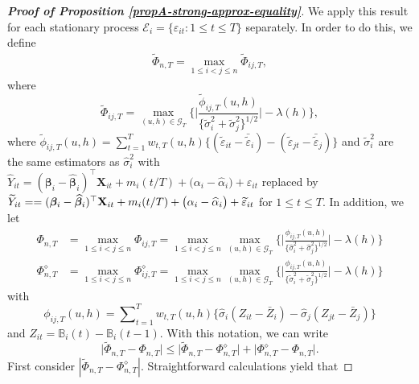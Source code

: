 \documentclass[a4paper,12pt]{article}
\begin{document}
\begin{proof}[\textnormal{\textbf{Proof of Proposition \ref{propA-strong-approx-equality}}}]
We apply this result for each stationary process $\mathcal{E}_i = \{\varepsilon_{it}: 1 \leq t \leq T\}$ separately. In order to do this, we define 
\begin{align}\label{Phi-tilde-statistic}
\widetilde{\Phi}_{n,T} = \max_{1 \le i < j \le n} \widetilde{\Phi}_{ij,T},
\end{align}
where
\[ \widetilde{\Phi}_{ij, T} = \max_{(u,h) \in \mathcal{G}_T} \Big\{ \Big|\frac{\widetilde{\phi}_{ij, T}(u,h)}{\{\widetilde{\sigma}_i^2 + \widetilde{\sigma}_j^2 \}^{1/2}} \Big| - \lambda(h) \Big\}, \]
where $\widetilde{\phi}_{ij, T}(u,h) = \sum\nolimits_{t=1}^T w_{t,T}(u,h) \big\{ (\widetilde{\varepsilon}_{it} - \bar{\widetilde{\varepsilon}}_i)  - (\widetilde{\varepsilon}_{jt} - \bar{\widetilde{\varepsilon}}_j)\big\}$ and $\widetilde{\sigma}^2_i$ are the same estimators as $\widehat{\sigma}^2_i$ with $\widehat{Y}_{it} = (\bm{\beta}_i - \widehat{\bm{\beta}}_i)^\top \mathbf{X}_{it} + m_i ( t/T) + \big( \alpha_i - \widehat{\alpha}_i \big) + \varepsilon_{it}$
replaced by $\widetilde{Y}_{it} = \linebreak = (\bm{\beta}_i - \widehat{\bm{\beta}}_i)^\top \mathbf{X}_{it} + m_i(t/T) + \big( \alpha_i - \widehat{\alpha}_i \big) + \widetilde{\varepsilon}_{it}$  for $1 \le t \le T$. In addition, we let
\begin{align*}
\Phi_{n, T} & = \max_{1\leq i < j \leq n} \Phi_{ij, T}= \max_{1\leq i < j \leq n} \max_{(u,h) \in \mathcal{G}_T} \Big\{ \Big|\frac{\phi_{ij, T}(u,h)}{\{\widehat{\sigma}_i^2 + \widehat{\sigma}_j^2 \}^{1/2}}\Big| - \lambda(h) \Big\} \\
\Phi_{n, T}^{\diamond} & =\max_{1\leq i < j \leq n} \Phi_{ij, T}^{\diamond} = \max_{1\leq i< j \leq n}\max_{(u,h) \in \mathcal{G}_T} \Big\{ \Big|\frac{\phi_{ij, T}(u,h)}{\{\widetilde{\sigma}_i^2 + \widetilde{\sigma}_j^2 \}^{1/2}}\Big| - \lambda(h) \Big\} 
\end{align*}
with $$\phi_{ij, T}(u,h) = \sum\nolimits_{t=1}^T w_{t,T}(u,h) \big\{ \widehat{\sigma}_i (Z_{it} - \bar{Z}_i) - \widehat{\sigma}_j (Z_{jt} - \bar{Z}_j) \big\}$$ and $Z_{it} = \mathbb{B}_i(t) - \mathbb{B}_i(t-1)$. With this notation, we can write 
\begin{equation}\label{eq-strongapprox-bound1}
\big| \widetilde{\Phi}_{n, T} - \Phi_{n, T} \big| \le \big| \widetilde{\Phi}_{n, T} - \Phi_{n, T}^{\diamond} \big| + \big| \Phi_{n, T}^{\diamond} - \Phi_{n, T} \big|. 
\end{equation}
First consider $|\widetilde{\Phi}_{n, T} - \Phi_{n, T}^{\diamond}|$. Straightforward calculations yield that 

\end{proof}
\end{document}
